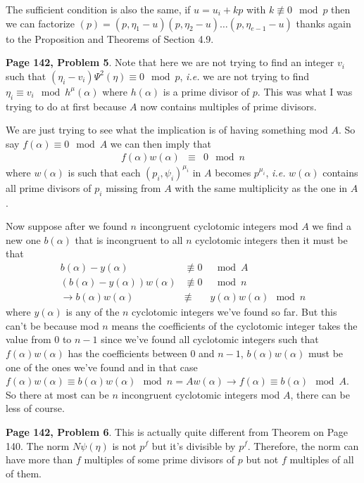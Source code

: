 \documentclass[aps,preprint,preprintnumbers,nofootinbib,showpacs,prd]{revtex4-1}
\newcommand{\ie}{{\it i.e.} }
\newcommand{\nbea}{\begin{eqnarray*}}
\newcommand{\neea}{\end{eqnarray*}}
\begin{document}
The sufficient condition is also the same, if $u = u_i + kp$ with $k \not\equiv 0 \mod p$ then we can factorize $(p) = (p, \eta_1 - u)(p, \eta_2 - u) \dots (p, \eta_{e - 1} - u)$ thanks again to the Proposition and Theorems of Section 4.9.



{\bf Page 142, Problem 5}. Note that here we are not trying to find an integer $v_i$ such that $(\eta_i - v_i)\Psi^2(\eta) \equiv 0 \mod p$, \ie we are not trying to find $\eta_i \equiv v_i \mod h^\mu(\alpha)$ where $h(\alpha)$ is a prime divisor of $p$. This was what I was trying to do at first because $A$ now contains multiples of prime divisors.

We are just trying to see what the implication is of having something mod $A$. So say $f(\alpha) \equiv 0 \mod A$ we can then imply that
%
\nbea
f(\alpha) w(\alpha) & \equiv & 0 \mod n
\neea
%
where $w(\alpha)$ is such that each $(p_i, \psi_i)^{\mu_i}$ in $A$ becomes $p^{\mu_i}$, \ie $w(\alpha)$ contains all prime divisors of $p_i$ missing from $A$ with the same multiplicity as the one in $A$.

Now suppose after we found $n$ incongruent cyclotomic integers mod $A$ we find a new one $b(\alpha)$ that is incongruent to all $n$ cyclotomic integers then it must be that
%
\nbea
b(\alpha) - y(\alpha) & \not\equiv 0 & \mod A \\
(b(\alpha) - y(\alpha))w(\alpha) & \not\equiv 0 & \mod n \\
\to  b(\alpha)w(\alpha) & \not\equiv & y(\alpha)w(\alpha) \mod n 
\neea
% 
where $y(\alpha)$ is any of the $n$ cyclotomic integers we've found so far. But this can't be because mod $n$ means the coefficients of the cyclotomic integer takes the value from $0$ to $n - 1$ since we've found all cyclotomic integers such that $f(\alpha)w(\alpha)$ has the coefficients between $0$ and $n - 1$, $b(\alpha)w(\alpha)$ must be one of the ones we've found and in that case $f(\alpha)w(\alpha) \equiv b(\alpha) w(\alpha) \mod n=Aw(\alpha) \to f(\alpha) \equiv b(\alpha) \mod A$. So there at most can be $n$ incongruent cyclotomic integers mod $A$, there can be less of course.

{\bf Page 142, Problem 6}. This is actually quite different from Theorem on Page 140. The norm $N\psi(\eta)$ is not $p^f$ but it's divisible by $p^f$. Therefore, the norm can have more than $f$ multiples of some prime divisors of $p$ but not $f$ multiples of all of them.
\end{document}

